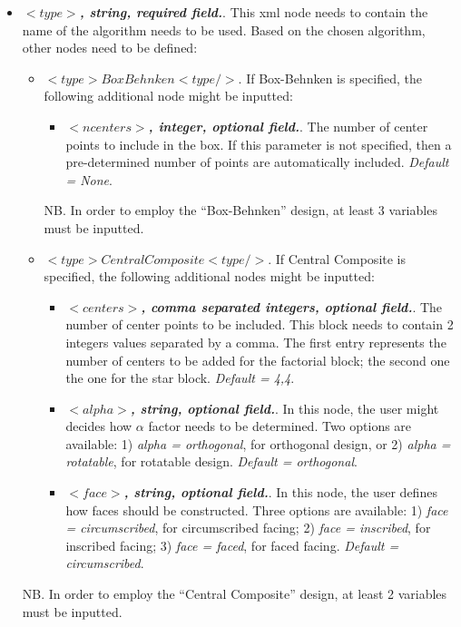      \begin{itemize}
      \item $<type>$\textbf{\textit{, string, required field.}}. This xml node needs to contain the name of the algorithm needs to be used. Based on the chosen algorithm, other nodes need to be defined:
      \begin{itemize}
        \item \textit{$<type>BoxBehnken<type/>$}. If Box-Behnken is specified, the following additional node might be inputted:
         \begin{itemize}
          \item $<ncenters>$\textbf{\textit{, integer, optional field.}}. The number of center points to include in the box.  If this parameter is not specified, then a pre-determined number of points are automatically included. \textit{Default = None}.
         \end{itemize}
         NB. In order to employ the ``Box-Behnken'' design, at least 3 variables must be inputted.
         \item \textit{$<type>CentralComposite<type/>$}. If Central Composite is specified, the following additional nodes might be inputted:
         \begin{itemize}
          \item $<centers>$\textbf{\textit{, comma separated integers, optional field.}}. The number of center points to be included. This block needs to contain 2 integers values separated by a comma. The first entry represents the number of centers to be added for the factorial block; the second one the one for the star block. \textit{Default = 4,4}.
          \item $<alpha>$\textbf{\textit{, string, optional field.}}. In this node, the user might decides how $\alpha$ factor needs to be determined. Two options are available: 1) \textit{alpha = orthogonal}, for orthogonal design, or 2) \textit{alpha = rotatable}, for rotatable design. \textit{Default = orthogonal}.
          \item $<face>$\textbf{\textit{, string, optional field.}}. In this node, the user defines how faces should be constructed. Three options are available: 1) \textit{face = circumscribed}, for circumscribed facing; 2) \textit{face = inscribed}, for inscribed facing; 3)  \textit{face = faced}, for faced facing. \textit{Default = circumscribed}.
         \end{itemize}
      \end{itemize}  
      NB. In order to employ the ``Central Composite'' design, at least 2 variables must be inputted.
    \end{itemize}  
